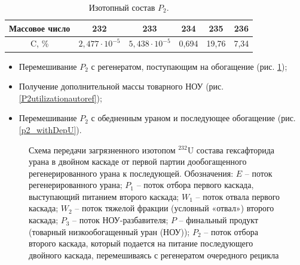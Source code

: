 \begin{table}[h]
  \centering
  \caption{{Изотопный состав $P_2$.{\label{P2_compositions_autoref}}}}
    \begin{tabular}{|c|c|c|c|c|c|}
    \hline Массовое число & 232 & 233 & 234 & 235 & 236 \\
    \hline C, \% & $2,477\cdot10^{-5}$ & $5,438\cdot10^{-5}$ & 0,694 & 19,76 & 7,34 \\ \hline
  \end{tabular}
\end{table}

\begin{itemize}
  \item Перемешивание $P_2$ с регенератом, поступающим на обогащение (рис. \ref{P2utilizationRingautoref});
  \item Получение дополнительной массы товарного НОУ (рис. \ref{P2utilizationautoref});
  \item Перемешивание $P_2$ с обедненным ураном и последующее обогащение (рис. \ref{p2_withDepU}).
\end{itemize}

\begin{figure}[ht]
  \caption{Схема передачи загрязненного изотопом $^{232}$U состава гексафторида урана в двойном каскаде от первой партии дообогащенного регенерированного урана к последующей. Обозначения: $E$ -- поток регенерированного урана; $P_1$ -- поток отбора первого каскада, выступающий питанием второго каскада; $W_1$ -- поток отвала первого каскада; $W_2$ -- поток тяжелой фракции (условный «отвал») второго каскада; $P_3$ -- поток НОУ-разбавителя; $P$ -- финальный продукт (товарный низкообогащенный уран (НОУ)); $P_2$ -- поток отбора второго каскада, который подается на питание последующего двойного каскада, перемешиваясь с регенератом очередного рецикла}\label{P2utilizationRingautoref}
\end{figure}

